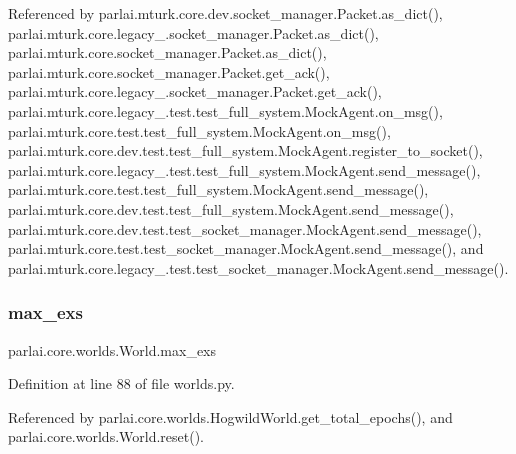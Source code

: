 Referenced by parlai.\+mturk.\+core.\+dev.\+socket\+\_\+manager.\+Packet.\+as\+\_\+dict(), parlai.\+mturk.\+core.\+legacy\+\_.\+socket\+\_\+manager.\+Packet.\+as\+\_\+dict(), parlai.\+mturk.\+core.\+socket\+\_\+manager.\+Packet.\+as\+\_\+dict(), parlai.\+mturk.\+core.\+socket\+\_\+manager.\+Packet.\+get\+\_\+ack(), parlai.\+mturk.\+core.\+legacy\+\_.\+socket\+\_\+manager.\+Packet.\+get\+\_\+ack(), parlai.\+mturk.\+core.\+legacy\+\_.\+test.\+test\+\_\+full\+\_\+system.\+Mock\+Agent.\+on\+\_\+msg(), parlai.\+mturk.\+core.\+test.\+test\+\_\+full\+\_\+system.\+Mock\+Agent.\+on\+\_\+msg(), parlai.\+mturk.\+core.\+dev.\+test.\+test\+\_\+full\+\_\+system.\+Mock\+Agent.\+register\+\_\+to\+\_\+socket(), parlai.\+mturk.\+core.\+legacy\+\_.\+test.\+test\+\_\+full\+\_\+system.\+Mock\+Agent.\+send\+\_\+message(), parlai.\+mturk.\+core.\+test.\+test\+\_\+full\+\_\+system.\+Mock\+Agent.\+send\+\_\+message(), parlai.\+mturk.\+core.\+dev.\+test.\+test\+\_\+full\+\_\+system.\+Mock\+Agent.\+send\+\_\+message(), parlai.\+mturk.\+core.\+dev.\+test.\+test\+\_\+socket\+\_\+manager.\+Mock\+Agent.\+send\+\_\+message(), parlai.\+mturk.\+core.\+test.\+test\+\_\+socket\+\_\+manager.\+Mock\+Agent.\+send\+\_\+message(), and parlai.\+mturk.\+core.\+legacy\+\_.\+test.\+test\+\_\+socket\+\_\+manager.\+Mock\+Agent.\+send\+\_\+message().

\mbox{\label{classparlai_1_1core_1_1worlds_1_1World_a1fd36ad5eb83d8ac70bd20c0b3752b37}} 
\subsubsection{\texorpdfstring{max\+\_\+exs}{max\_exs}}
{\footnotesize\ttfamily parlai.\+core.\+worlds.\+World.\+max\+\_\+exs}



Definition at line 88 of file worlds.\+py.



Referenced by parlai.\+core.\+worlds.\+Hogwild\+World.\+get\+\_\+total\+\_\+epochs(), and parlai.\+core.\+worlds.\+World.\+reset().

\mbox{\label{classparlai_1_1core_1_1worlds_1_1World_a3640d92718acd3e6942a28c1ab3678bd}} 
